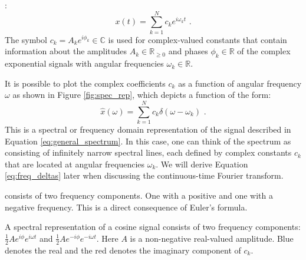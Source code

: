 :
\begin{equation}
  x(t) = \sum_{k=1}^N c_k e^{i\omega_k t} \,\,.
  \label{eq:general_spectrum}
\end{equation}
The symbol $c_k = A_k e^{i\phi_k} \in \mathbb{C}$ is used for complex-valued constants that contain information about the
amplitudes $A_k \in \mathbb{R}_{\ge 0}$ and phases $\phi_k \in \mathbb{R}$ of the complex exponential
signals with angular frequencies $\omega_k \in \mathbb{R}$.

It is possible to plot the complex coefficients $c_k$ as a function of angular frequency $\omega$ as
shown in Figure \ref{fig:spec_rep}, which depicts a function of the form:
\begin{equation}
  \hat{x}(\omega) = \sum_{k=1}^N c_k \delta(\omega - \omega_k) \,\,.
  \label{eq:freq_deltas}
\end{equation}
This is a spectral or frequency domain representation of the signal described in Equation \ref{eq:general_spectrum}.
In this case, one can think of the spectrum as consisting of infinitely narrow spectral lines,
each defined by complex constants $c_k$ that are located at angular frequencies $\omega_k$.
We will derive Equation \ref{eq:freq_deltas} later when discussing the continuous-time Fourier transform.

 consists of two frequency components.
One with a positive and one with a negative frequency. This is a direct consequence of Euler's formula.

\begin{marginfigure}
  \begin{center}
  \end{center}
  \caption{A spectral representation of a cosine signal consists of two frequency components:
  $\frac{1}{2}Ae^{i\phi}e^{i\omega t}$ and $\frac{1}{2}Ae^{-i\phi}e^{-i\omega t}$.
  Here $A$ is a non-negative real-valued amplitude. Blue denotes the real and the red denotes the imaginary component of $c_k$.}
  \label{fig:exspecsin}
\end{marginfigure}


